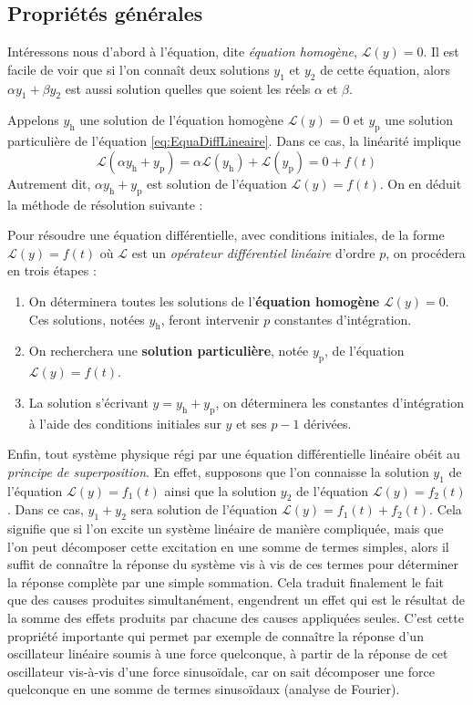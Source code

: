 \subsection{Propriétés générales}
Intéressons nous d'abord à l'équation, dite \emph{équation homogène}, $\mathcal{L}(y)=0$. Il est facile de voir que si l'on connaît deux solutions $y_{1}$ et $y_{2}$ de cette équation, alors $\alpha y_{1}+ \beta y_{2}$  est aussi solution quelles que soient les réels $\alpha$  et $\beta$.

Appelons $y_\text{h}$ une solution de l'équation homogène $\mathcal{L}(y)=0$ et  $y_\text{p}$ une solution particulière de l'équation \eqref{eq:EquaDiffLineaire}. Dans ce cas, la linéarité implique 
$$\mathcal{L}(\alpha y_\text{h}+y_\text{p})=\alpha \mathcal{L}(y_\text{h})+\mathcal{L}(y_\text{p})=0+f(t)$$
Autrement dit, $\alpha y_\text{h}+y_\text{p}$  est solution de l'équation $\mathcal{L}(y)=f(t)$. On en déduit la méthode de résolution suivante :

\begin{kaobox}[frametitle=Méthodologie]
Pour résoudre une équation différentielle, avec conditions initiales,  de la forme $\mathcal{L}(y)=f(t)$ où $\mathcal{L}$ est un \emph{opérateur différentiel linéaire} d'ordre $p$, on procédera en trois étapes :
\begin{enumerate}
	\item On déterminera toutes les solutions de l'\textbf{équation homogène}  $\mathcal{L}(y)=0$. Ces solutions, notées $y_\text{h}$, feront intervenir $p$ constantes d'intégration.
	\item On recherchera une \textbf{solution particulière}, notée $y_\text{p}$, de l'équation $\mathcal{L}(y)=f(t)$.
	\item La solution s'écrivant  $y=y_\text{h}+y_\text{p}$, on déterminera les constantes d'intégration à l'aide des conditions initiales sur $y$  et ses $p-1$ dérivées.  
\end{enumerate}
\end{kaobox}

Enfin, tout système physique régi par une équation différentielle linéaire obéit au \emph{principe de superposition}. En effet, supposons que l'on connaisse la solution $y_{1}$ de l'équation $\mathcal{L}(y)=f_{1}(t)$  ainsi que la solution $y_{2}$ de l'équation $\mathcal{L}(y)=f_{2}(t)$. Dans ce cas, $y_{1}+y_{2}$ sera solution de l'équation $\mathcal{L}(y)=f_{1}(t)+f_{2}(t)$. Cela signifie que si l'on excite un système linéaire de manière compliquée, mais que l'on peut décomposer cette excitation en une somme de termes simples, alors il suffit de connaître la réponse du système vis à vis de ces termes pour déterminer la réponse complète par une simple sommation. Cela traduit finalement le fait que des causes produites simultanément, engendrent un effet qui est le résultat de la somme des effets produits par chacune des causes appliquées seules. C'est cette propriété importante qui permet par exemple de connaître la réponse d'un oscillateur linéaire soumis à une force quelconque, à partir de la réponse de cet oscillateur vis-à-vis d'une force sinusoïdale, car on sait décomposer une force quelconque en une somme de termes sinusoïdaux (analyse de Fourier).
 
